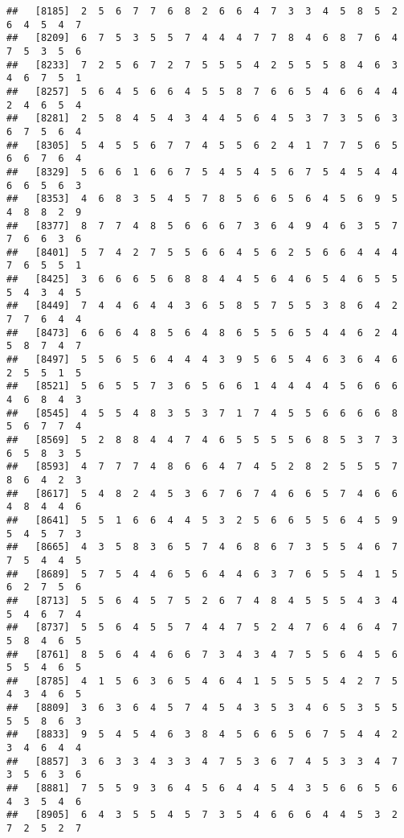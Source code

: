 \documentclass[
]{book}
\begin{document}
\begin{verbatim}
##   [8185]  2  5  6  7  7  6  8  2  6  6  4  7  3  3  4  5  8  5  2  6  4  5  4  7
##   [8209]  6  7  5  3  5  5  7  4  4  4  7  7  8  4  6  8  7  6  4  7  5  3  5  6
##   [8233]  7  2  5  6  7  2  7  5  5  5  4  2  5  5  5  8  4  6  3  4  6  7  5  1
##   [8257]  5  6  4  5  6  6  4  5  5  8  7  6  6  5  4  6  6  4  4  2  4  6  5  4
##   [8281]  2  5  8  4  5  4  3  4  4  5  6  4  5  3  7  3  5  6  3  6  7  5  6  4
##   [8305]  5  4  5  5  6  7  7  4  5  5  6  2  4  1  7  7  5  6  5  6  6  7  6  4
##   [8329]  5  6  6  1  6  6  7  5  4  5  4  5  6  7  5  4  5  4  4  6  6  5  6  3
##   [8353]  4  6  8  3  5  4  5  7  8  5  6  6  5  6  4  5  6  9  5  4  8  8  2  9
##   [8377]  8  7  7  4  8  5  6  6  6  7  3  6  4  9  4  6  3  5  7  7  6  6  3  6
##   [8401]  5  7  4  2  7  5  5  6  6  4  5  6  2  5  6  6  4  4  4  7  6  5  5  1
##   [8425]  3  6  6  6  5  6  8  8  4  4  5  6  4  6  5  4  6  5  5  5  4  3  4  5
##   [8449]  7  4  4  6  4  4  3  6  5  8  5  7  5  5  3  8  6  4  2  7  7  6  4  4
##   [8473]  6  6  6  4  8  5  6  4  8  6  5  5  6  5  4  4  6  2  4  5  8  7  4  7
##   [8497]  5  5  6  5  6  4  4  4  3  9  5  6  5  4  6  3  6  4  6  2  5  5  1  5
##   [8521]  5  6  5  5  7  3  6  5  6  6  1  4  4  4  4  5  6  6  6  4  6  8  4  3
##   [8545]  4  5  5  4  8  3  5  3  7  1  7  4  5  5  6  6  6  6  8  5  6  7  7  4
##   [8569]  5  2  8  8  4  4  7  4  6  5  5  5  5  6  8  5  3  7  3  6  5  8  3  5
##   [8593]  4  7  7  7  4  8  6  6  4  7  4  5  2  8  2  5  5  5  7  8  6  4  2  3
##   [8617]  5  4  8  2  4  5  3  6  7  6  7  4  6  6  5  7  4  6  6  4  8  4  4  6
##   [8641]  5  5  1  6  6  4  4  5  3  2  5  6  6  5  5  6  4  5  9  5  4  5  7  3
##   [8665]  4  3  5  8  3  6  5  7  4  6  8  6  7  3  5  5  4  6  7  7  5  4  4  5
##   [8689]  5  7  5  4  4  6  5  6  4  4  6  3  7  6  5  5  4  1  5  6  2  7  5  6
##   [8713]  5  5  6  4  5  7  5  2  6  7  4  8  4  5  5  5  4  3  4  5  4  6  7  4
##   [8737]  5  5  6  4  5  5  7  4  4  7  5  2  4  7  6  4  6  4  7  5  8  4  6  5
##   [8761]  8  5  6  4  4  6  6  7  3  4  3  4  7  5  5  6  4  5  6  5  5  4  6  5
##   [8785]  4  1  5  6  3  6  5  4  6  4  1  5  5  5  5  4  2  7  5  4  3  4  6  5
##   [8809]  3  6  3  6  4  5  7  4  5  4  3  5  3  4  6  5  3  5  5  5  5  8  6  3
##   [8833]  9  5  4  5  4  6  3  8  4  5  6  6  5  6  7  5  4  4  2  3  4  6  4  4
##   [8857]  3  6  3  3  4  3  3  4  7  5  3  6  7  4  5  3  3  4  7  3  5  6  3  6
##   [8881]  7  5  5  9  3  6  4  5  6  4  4  5  4  3  5  6  6  5  6  4  3  5  4  6
##   [8905]  6  4  3  5  5  4  5  7  3  5  4  6  6  6  4  4  5  3  2  7  2  5  2  7

\end{verbatim}
\end{document}
